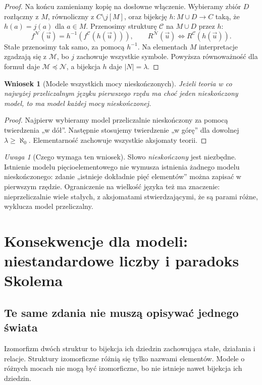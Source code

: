 \documentclass[11pt,a4paper]{article}
\numberwithin{equation}{section}
\theoremstyle{plain}
\newtheorem{wniosek}[twierdzenie]{Wniosek}
\theoremstyle{definition}
\theoremstyle{remark}
\newtheorem{uwaga}[twierdzenie]{Uwaga}
\begin{document}
\begin{proof}
Na końcu zamieniamy kopię na dosłowne włączenie. Wybieramy zbiór $D$ rozłączny z $M$, równoliczny z $C\setminus j[M]$, oraz bijekcję $h:M\cup D\to C$ taką, że $h(a)=j(a)$ dla $a\in M$. Przenosimy strukturę $\mathcal C$ na $M\cup D$ przez $h$:
\[
f^{\mathcal N}(\vec u)=h^{-1}(f^{\mathcal C}(h(\vec u))),\qquad
R^{\mathcal N}(\vec u)\Longleftrightarrow R^{\mathcal C}(h(\vec u)).
\]
Stałe przenosimy tak samo, za pomocą $h^{-1}$. Na elementach $M$ interpretacje zgadzają się z $\mathcal M$, bo $j$ zachowuje wszystkie symbole. Powyższa równoważność dla formuł daje $\mathcal M\preccurlyeq\mathcal N$, a bijekcja $h$ daje $|N|=\lambda$.
\end{proof}

\begin{wniosek}[Modele wszystkich mocy nieskończonych]\label{res:14:10}
Jeżeli teoria w co najwyżej przeliczalnym języku pierwszego rzędu ma choć jeden nieskończony model, to ma model każdej mocy nieskończonej.
\end{wniosek}
\begin{proof}
Najpierw wybieramy model przeliczalnie nieskończony za pomocą twierdzenia „w dół”. Następnie stosujemy twierdzenie „w górę” dla dowolnej $\lambda\ge\aleph_0$. Elementarność zachowuje wszystkie aksjomaty teorii.
\end{proof}

\begin{uwaga}[Czego wymaga ten wniosek]\label{res:14:11}
Słowo \emph{nieskończony} jest niezbędne. Istnienie modelu pięcioelementowego nie wymusza istnienia żadnego modelu nieskończonego: zdanie „istnieje dokładnie pięć elementów” można zapisać w pierwszym rzędzie. Ograniczenie na wielkość języka też ma znaczenie: nieprzeliczalnie wiele stałych, z aksjomatami stwierdzającymi, że są parami różne, wyklucza model przeliczalny.
\end{uwaga}

\section{Konsekwencje dla modeli: niestandardowe liczby i paradoks Skolema}\label{sec:modele-konsekwencje}
\subsection*{Te same zdania nie muszą opisywać jednego świata}\label{sec:15:1}
Izomorfizm dwóch struktur to bijekcja ich dziedzin zachowująca stałe, działania i relacje. Struktury izomorficzne różnią się tylko nazwami elementów. Modele o różnych mocach nie mogą być izomorficzne, bo nie istnieje nawet bijekcja ich dziedzin.
\end{document}

